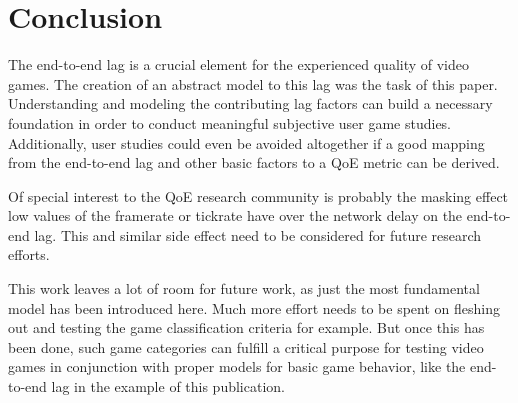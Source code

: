 \section{Conclusion}
\label{sec:conclusion}

The end-to-end lag is a crucial element for the experienced quality of video games. The creation of an abstract model to this lag was the task of this paper. Understanding and modeling the contributing lag factors can build a necessary foundation in order to conduct meaningful subjective user game studies. Additionally, user studies could even be avoided altogether if a good mapping from the end-to-end lag and other basic factors to a \gls{QoE} metric can be derived. 

Of special interest to the \gls{QoE} research community is probably the masking effect low values of the framerate or tickrate have over the network delay on the end-to-end lag. This and similar side effect need to be considered for future research efforts.

This work leaves a lot of room for future work, as just the most fundamental model has been introduced here. Much more effort needs to be spent on fleshing out and testing the game classification criteria for example. But once this has been done, such game categories can fulfill a critical purpose for testing video games in conjunction with proper models for basic game behavior, like the end-to-end lag in the example of this publication.